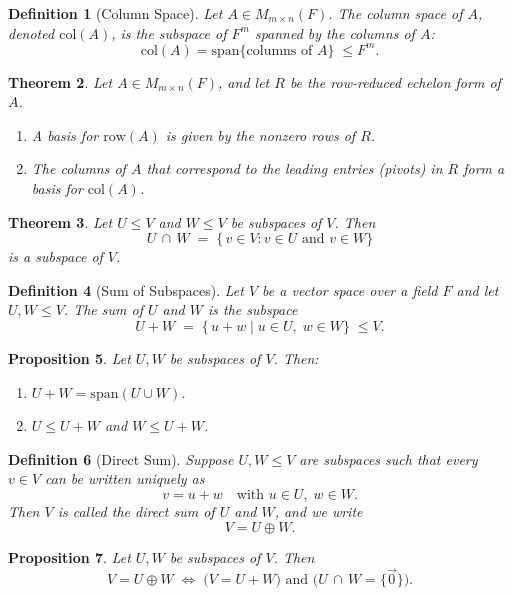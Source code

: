 \documentclass[12pt]{article}
\theoremstyle{break}             %
\newtheorem{thm}{Theorem}          %
\newtheorem{prop}[thm]{Proposition}%
\newtheorem{defn}[thm]{Definition}
\begin{document}
\begin{defn}[Column Space]
Let \(A\in M_{m\times n}(F)\).  The \emph{column space} of \(A\), denoted \(\mathrm{col}(A)\), is the subspace of \(F^m\) spanned by the columns of \(A\):
\[
\mathrm{col}(A)
=\mathrm{span}\{\text{columns of }A\}
\;\le F^m.
\]
\end{defn}

\begin{thm}
Let \(A \in M_{m\times n}(F)\), and let \(R\) be the row-reduced echelon form of \(A\).  
\begin{enumerate}
\item A basis for \(\mathrm{row}(A)\) is given by the nonzero rows of \(R\).
\item The columns of \(A\) that correspond to the leading entries (pivots) in \(R\) form a basis for \(\mathrm{col}(A)\).
\end{enumerate}
\end{thm}

\begin{thm}
Let \(U \le V\) and \(W \le V\) be subspaces of \(V\). Then 
\[
U \,\cap\, W \;=\; \{\,v \in V : v \in U \text{ and } v \in W\}
\]
is a subspace of \(V\).
\end{thm}

\begin{defn}[Sum of Subspaces]
Let \(V\) be a vector space over a field \(F\) and let \(U,W\leq V\).  The \emph{sum} of \(U\) and \(W\) is the subspace
\[
U + W \;=\;\{\,u + w \mid u\in U,\;w\in W\}\;\leq V.
\]
\end{defn}

\begin{prop}
Let \(U,W\) be subspaces of \(V\). Then:
\begin{enumerate}
\item \(U + W = \mathrm{span}(U \cup W)\).
\item \(U \le U + W\) and \(W \le U + W\).
\end{enumerate}
\end{prop}

\begin{defn}[Direct Sum]
Suppose \(U,W\leq V\) are subspaces such that every \(v\in V\) can be written uniquely as
\[
v = u + w
\quad\text{with }u\in U,\;w\in W.
\]
Then \(V\) is called the \emph{direct sum} of \(U\) and \(W\), and we write
\[
V = U \oplus W.
\]
\end{defn}

\begin{prop}
Let \(U,W\) be subspaces of \(V\). Then
\[
V = U \oplus W 
\;\Longleftrightarrow\;
\bigl(V = U + W\bigr) \text{ and } \bigl(U \,\cap\, W = \{\vec{0}\}\bigr).
\]
\end{prop}
\end{document}
